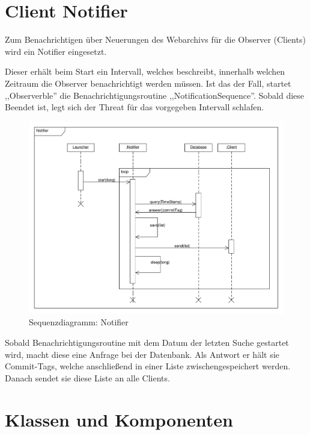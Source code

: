 \section {Client Notifier}
Zum Benachrichtigen über Neuerungen des Webarchivs für die Observer (Clients) wird ein Notifier eingesetzt.

Dieser erhält beim Start ein Intervall, welches beschreibt, innerhalb welchen Zeitraum die Observer  benachrichtigt werden müssen. 
Ist das der Fall, startet ,,Observerble'' die Benachrichtigungsroutine  ,,NotificationSequence''.
Sobald diese Beendet ist, legt sich der Threat  für das vorgegeben Intervall schlafen.

\begin{figure}[H]
	\centering
	\includegraphics[width=\textwidth]{design/frontend/sequence/notifySequence.pdf}
	\caption{Sequenzdiagramm: Notifier}
\end{figure}

Sobald Benachrichtigungsroutine mit dem Datum der letzten Suche gestartet wird, macht diese eine Anfrage bei der Datenbank. Als Antwort er hält sie Commit-Tags, welche anschließend in einer Liste zwischengespeichert werden. Danach sendet sie diese Liste an alle Clients. 


\section{Klassen und Komponenten}

